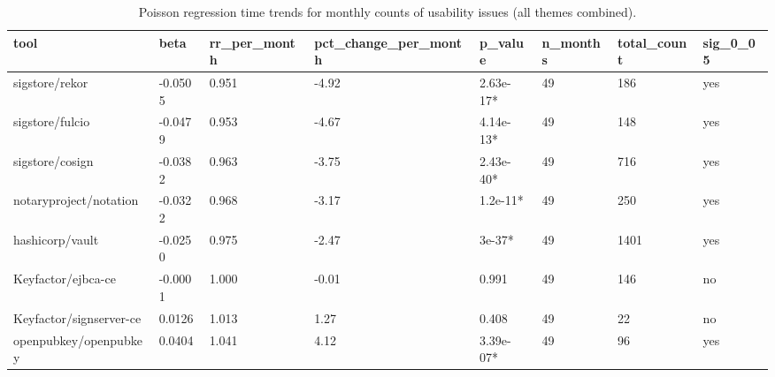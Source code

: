 \begin{table}[t]
\centering
\caption{Poisson regression time trends for monthly counts of usability issues (all themes combined).}
\label{tab:poisson-overall-trends}
\scriptsize
\begin{tabular}{llllllll}
\hline
tool & beta & rr\_per\_month & pct\_change\_per\_month & p\_value & n\_months & total\_count & sig\_0\_05 \\
\hline
sigstore/rekor & -0.0505 & 0.951 & -4.92 & 2.63e-17* & 49 & 186 & yes \\
sigstore/fulcio & -0.0479 & 0.953 & -4.67 & 4.14e-13* & 49 & 148 & yes \\
sigstore/cosign & -0.0382 & 0.963 & -3.75 & 2.43e-40* & 49 & 716 & yes \\
notaryproject/notation & -0.0322 & 0.968 & -3.17 & 1.2e-11* & 49 & 250 & yes \\
hashicorp/vault & -0.0250 & 0.975 & -2.47 & 3e-37* & 49 & 1401 & yes \\
Keyfactor/ejbca-ce & -0.0001 & 1.000 & -0.01 & 0.991 & 49 & 146 & no \\
Keyfactor/signserver-ce & 0.0126 & 1.013 & 1.27 & 0.408 & 49 & 22 & no \\
openpubkey/openpubkey & 0.0404 & 1.041 & 4.12 & 3.39e-07* & 49 & 96 & yes \\
\hline
\end{tabular}
\end{table}
